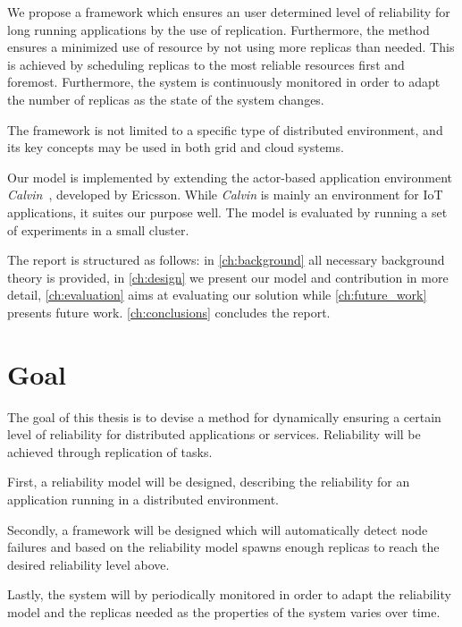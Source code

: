 \documentclass{cslthse-msc}
\begin{document}
We propose a framework which ensures an user determined level of reliability for long running applications by the use of replication. Furthermore, the method ensures a minimized use of resource by not using more replicas than needed. This is achieved by scheduling replicas to the most reliable resources first and foremost. Furthermore, the system is continuously monitored in order to adapt the number of replicas as the state of the system changes.

The framework is not limited to a specific type of distributed environment, and its key concepts may be used in both grid and cloud systems.


Our model is implemented by extending the actor-based application environment \emph{Calvin}~\cite{calvin}, developed by Ericsson. While \emph{Calvin} is mainly an environment for IoT applications, it suites our purpose well. The model is evaluated by running a set of experiments in a small cluster. %

The report is structured as follows: in \autoref{ch:background} all necessary background theory is provided, in \autoref{ch:design} we present our model and contribution in more detail, \autoref{ch:evaluation} aims at evaluating our solution while \autoref{ch:future_work} presents future work. \autoref{ch:conclusions} concludes the report. 

\section{Goal} \label{sec:introduction_goals}
The goal of this thesis is to devise a method for dynamically ensuring a certain level of reliability for distributed applications or services. Reliability will be achieved through replication of tasks.

First, a reliability model will be designed, describing the reliability for an application running in a distributed environment.

Secondly, a framework will be designed which will automatically detect node failures and based on the reliability model spawns enough replicas to reach the desired reliability level above.

Lastly, the system will by periodically monitored in order to adapt the reliability model and the replicas needed as the properties of the system varies over time.
\end{document}
